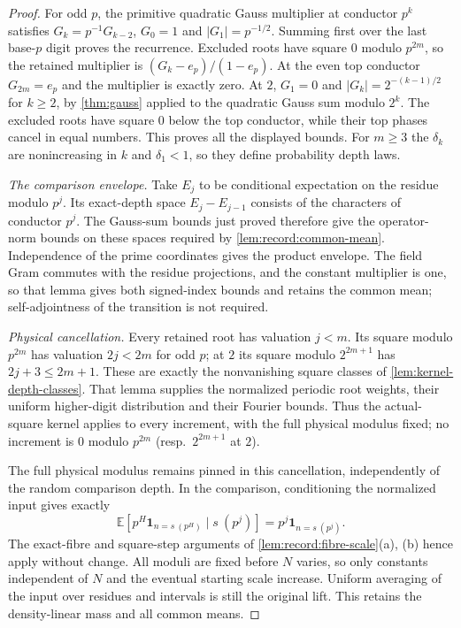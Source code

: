 \begin{proof}
For odd $p$, the primitive quadratic Gauss multiplier at conductor
$p^k$ satisfies $G_k=p^{-1}G_{k-2}$, $G_0=1$ and
$|G_1|=p^{-1/2}$.  Summing first over the last base-$p$ digit
proves the recurrence.  Excluded roots have square $0$ modulo
$p^{2m}$, so the retained multiplier is
$(G_k-e_p)/(1-e_p)$.  At the even top conductor $G_{2m}=e_p$
and the multiplier is exactly zero.  At $2$, $G_1=0$ and
$|G_k|=2^{-(k-1)/2}$ for $k\ge2$, by \cref{thm:gauss} applied to the quadratic Gauss sum
modulo $2^k$.  The excluded roots
have square $0$ below the top conductor, while their top phases
cancel in equal numbers.  This proves all the displayed bounds.
For $m\ge3$ the $\delta_k$ are nonincreasing in $k$ and $\delta_1<1$, so they define probability depth laws.

\emph{The comparison envelope.} Take $E_j$ to be conditional expectation
on the residue modulo $p^j$. Its exact-depth space $E_j-E_{j-1}$
consists of the characters of conductor $p^j$. The Gauss-sum bounds
just proved therefore give the operator-norm bounds on these
spaces required by \cref{lem:record:common-mean}. Independence of the
prime coordinates gives the product envelope. The field Gram commutes
with the residue projections, and the constant multiplier is one, so
that lemma gives both signed-index bounds and retains the common mean;
self-adjointness of the transition is not required.

\emph{Physical cancellation.} Every retained root has valuation $j<m$.
Its square modulo $p^{2m}$ has valuation $2j<2m$ for odd $p$; at $2$
its square modulo $2^{2m+1}$ has $2j+3\le2m+1$. These are exactly the
nonvanishing square classes of \cref{lem:kernel-depth-classes}.
That lemma supplies the normalized periodic root weights, their uniform
higher-digit distribution and their Fourier bounds. Thus the
actual-square kernel applies to every increment, with the full physical
modulus fixed; no increment is $0$ modulo $p^{2m}$ (resp.\ $2^{2m+1}$ at $2$).

The full physical modulus remains pinned in this cancellation,
independently of the random comparison depth.  In the comparison,
conditioning the normalized input gives exactly
\[
 \mathbb E[p^H\mathbf1_{n=s\ (p^H)}\mid s\ (p^j)]
        =p^j\mathbf1_{n=s\ (p^j)}.
\]
The exact-fibre and square-step arguments of \cref{lem:record:fibre-scale}(a), (b) hence apply without change.  All moduli are fixed before $N$ varies, so
only constants independent of $N$ and the eventual starting scale increase.
Uniform averaging of the input over residues and intervals is
still the original lift.  This retains the density-linear mass
and all common means.
\end{proof}

